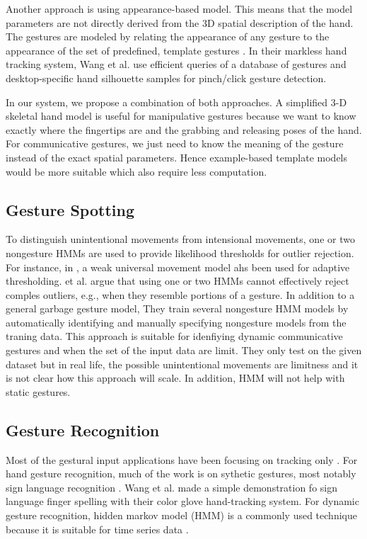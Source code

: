 Another approach is using appearance-based model. This means that the model
parameters are not directly derived from the 3D spatial description of the hand.
The gestures are modeled by relating the appearance of any gesture to the 
appearance of the set of predefined, template gestures \cite{Pavlovic97}. In
their markless hand tracking system, Wang et al. \cite{wang11} use efficient
queries of a database of gestures and desktop-specific hand silhouette samples
for pinch/click gesture detection.

In our system, we propose a combination of both approaches. A simplified 3-D
skeletal hand model is useful for manipulative gestures because we want to know 
exactly where the fingertips are and the grabbing and releasing poses of the hand. For
communicative gestures, we just need to know the meaning of the gesture instead
of the exact spatial parameters. Hence example-based template models would be
more suitable which also require less computation.

\subsection{Gesture Spotting}
To distinguish unintentional movements from intensional
movements, one or two nongesture HMMs are used to provide likelihood
thresholds for outlier rejection. For instance, in \cite{yang07}, a weak
universal movement model ahs been used for adaptive thresholding. \cite{peng11}
et al. argue that using one or two HMMs cannot effectively reject comples
outliers, e.g., when they resemble portions of a gesture. In addition to a
general garbage gesture model, They train several nongesture HMM models by
automatically identifying and manually specifying nongesture models from the
traning data. This approach is suitable for idenfiying dynamic communicative
gestures and when the set of the input data are limit. They only test on the
given dataset but in real life, the possible unintentional movements are
limitness and it is not clear how this approach will scale. In addition, HMM
will not help with static gestures. 

\subsection{Gesture Recognition}
Most of the gestural input applications have been focusing on tracking only
\cite{harrison11} \cite{larson11}. For hand gesture recognition, much of the
work is on sythetic gestures, most notably sign language recognition
\cite{Bauer00} \cite{kadous02}. Wang et al. \cite{Wang09} made a simple
demonstration fo sign language finger spelling with their color glove hand-tracking system. 
For dynamic gesture recognition, hidden markov model (HMM) is a commonly used
technique because it is suitable for time series data \cite{sharma00}. 

